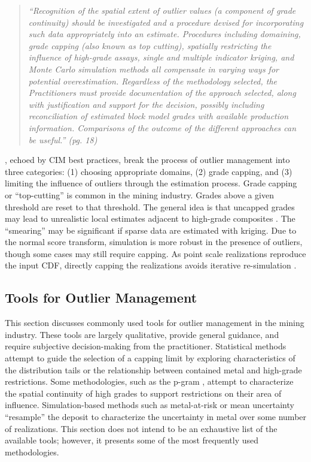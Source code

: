 \blockquote{\textit{``Recognition of the spatial extent of outlier values (a component of grade continuity) should be investigated and a procedure devised for incorporating such data appropriately into an estimate. Procedures including domaining, grade capping (also known as top cutting), spatially restricting the influence of high-grade assays, single and multiple indicator kriging, and Monte Carlo simulation methods all compensate in varying ways for potential overestimation. Regardless of the methodology selected, the Practitioners must provide documentation of the approach selected, along with justification and support for the decision, possibly including reconciliation of estimated block model grades with available production information. Comparisons of the outcome of the different approaches can be useful.'' (pg. 18)}}

\cite{leuangthong2015dealing}, echoed by CIM best practices, break the process of outlier management into three categories: (1) choosing appropriate domains, (2) grade capping, and (3) limiting the influence of outliers through the estimation process. Grade capping or ``top-cutting'' is common in the mining industry. Grades above a given threshold are reset to that threshold. The general idea is that uncapped grades may lead to unrealistic local estimates adjacent to high-grade composites \citep{nowak2013suggestions}. The ``smearing'' may be significant if sparse data are estimated with kriging. Due to the normal score transform, simulation is more robust in the presence of outliers, though some cases may still require capping. As point scale realizations reproduce the input \gls{CDF}, directly capping the realizations avoids iterative re-simulation \citep{harding2023probabilistic}.

\subsection{Tools for Outlier Management}
\label{subsec:02tools}

This section discusses commonly used tools for outlier management in the mining industry. These tools are largely qualitative, provide general guidance, and require subjective decision-making from the practitioner. Statistical methods attempt to guide the selection of a capping limit by exploring characteristics of the distribution tails or the relationship between contained metal and high-grade restrictions. Some methodologies, such as the p-gram \citep{nowak2019optimal}, attempt to characterize the spatial continuity of high grades to support restrictions on their area of influence. Simulation-based methods such as metal-at-risk \citep{parker2006} or mean uncertainty \citep{nowak2013suggestions} ``resample'' the deposit to characterize the uncertainty in metal over some number of realizations. This section does not intend to be an exhaustive list of the available tools; however, it presents some of the most frequently used methodologies.

